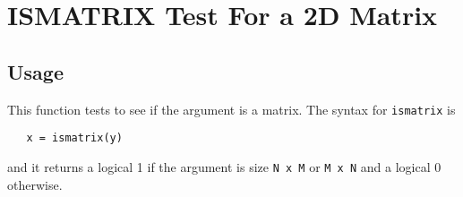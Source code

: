 \section{ISMATRIX Test For a 2D Matrix}

\subsection{Usage}

This function tests to see if the argument is a matrix.  The 
syntax for \verb|ismatrix| is
\begin{verbatim}
   x = ismatrix(y)
\end{verbatim}
and it returns a logical 1 if the argument is size \verb|N x M| or
\verb|M x N| and a logical 0 otherwise.
